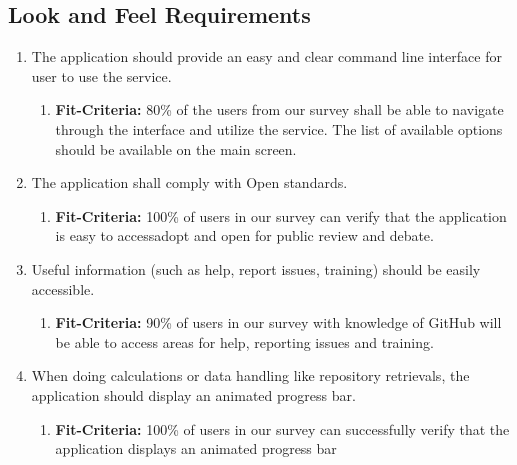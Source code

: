 \documentclass{article}
\begin{document}
\subsection{Look and Feel Requirements}
\begin{enumerate}
\item The application should provide an easy and clear command line interface for user to use the service.
   \begin{enumerate}
    \item \textbf{Fit-Criteria:} 80\% of the users from our survey shall be able to navigate through the interface and utilize the service. The list of available options should be available on the main screen. 
    \end{enumerate}
\item The application shall comply with Open standards.
   \begin{enumerate}
    \item \textbf{Fit-Criteria:} 100\% of users in our survey  can verify that the application is easy to access\/adopt and open for public review and debate.
    \end{enumerate}
\item Useful information (such as help, report issues, training) should be easily accessible.
   \begin{enumerate}
    \item \textbf{Fit-Criteria:} 90\% of users in our survey with knowledge of GitHub will be able to access areas for help, reporting issues and training. 
    \end{enumerate}
\item When doing calculations or data handling like repository retrievals, the application should display an animated progress bar. 
   \begin{enumerate}
    \item \textbf{Fit-Criteria:}  100\% of users in our survey  can successfully verify that the application displays an animated progress bar 
    \end{enumerate}
\end{enumerate}
\end{document}
